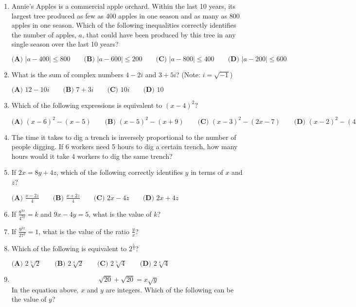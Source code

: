 \documentclass[../satmath.tex]{subfiles}
\begin{document}
\begin{enumerate}[label=\bfseries\arabic*.]
\item Annie's Apples is a commercial apple orchard. Within the last 10 years, its largest tree produced as few as 400 apples in one season and as many as 
800 apples in one season. Which of the following inequalities correctly identifies the number of apples, $a$, that could have been produced 
by this tree in any single season over the last 10 years?

$\textbf{(A) } |a-400|\leq 800 \qquad \textbf{(B) } |a-600|\leq 200 \qquad \textbf{(C) } |a-800|\leq 400 \qquad \textbf{(D) } |a-200|\leq 600$
 
\item What is the sum of complex numbers $4-2i$ and $3+5i$? (Note: $i=\sqrt{-1}$)

$\textbf{(A) } 12-10i \qquad \textbf{(B) } 7+3i \qquad \textbf{(C) } 10i \qquad \textbf{(D) } 10$

\item Which of the following expressions is equivalent to $(x-4)^2$?

$\textbf{(A) } (x-6)^2-(x-5) \qquad \textbf{(B) } (x-5)^2-(x+9) \qquad \textbf{(C) } (x-3)^2-(2x-7) \qquad \textbf{(D) } (x-2)^2-(4x-8)$

\item The time it takes to dig a trench is inversely proportional to the number of people digging. If 6 workers need 5 hours to dig a certain trench, 
how many hours would it take 4 workers to dig the same trench?
 
\item If $2x=8y+4z$, which of the following correctly identifies $y$ in terms of $x$ and $z$?

$ \textbf{(A) } \frac{x-2z}{4} \qquad \textbf{(B) } \frac{x+2z}{4} \qquad \textbf{(C) } 2x-4z \qquad \textbf{(D) } 2x+4z$
 
\item If $\frac{8^{3x}}{4^{2y}}=k$ and $9x-4y=5$, what is the value of $k$?
 
\item If $\frac{9^{3x}}{27^y}=1$, what is the value of the ratio $\frac{y}{x}$?
 
\item Which of the following is equivalent to $2^{\frac{5}{4}}$?

$\textbf{(A) } 2\sqrt[5]{2} \qquad \textbf{(B) } 2\sqrt[4]{2} \qquad \textbf{(C) } 2\sqrt[5]{4} \qquad \textbf{(D) } 2\sqrt[4]{4}$
 
\item 
\[\sqrt{20}+\sqrt{20}=x\sqrt{y}\]
In the equation above, $x$ and $y$ are integers. Which of the following can be the value of $y$?


\end{enumerate}
\end{document}

